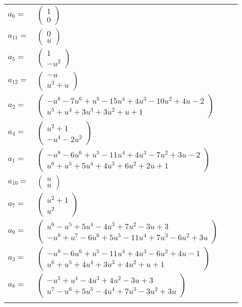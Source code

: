 \documentclass[1p]{elsarticle_modified}
\theoremstyle{definition}
\begin{document}
\begin{tabular}{m{7pt} m{180pt} m{7pt} m{180pt} }
\flushright $a_{6}=$&$\begin{pmatrix}1\\0\end{pmatrix}$ \\
\flushright $a_{11}=$&$\begin{pmatrix}0\\u\end{pmatrix}$ \\
\flushright $a_{5}=$&$\begin{pmatrix}1\\- u^2\end{pmatrix}$ \\
\flushright $a_{12}=$&$\begin{pmatrix}- u\\u^3+u\end{pmatrix}$ \\
\flushright $a_{2}=$&$\begin{pmatrix}- u^8-7 u^6+u^5-15 u^4+4 u^3-10 u^2+4 u-2\\u^5+u^4+3 u^3+3 u^2+u+1\end{pmatrix}$ \\
\flushright $a_{4}=$&$\begin{pmatrix}u^2+1\\- u^4-2 u^2\end{pmatrix}$ \\
\flushright $a_{1}=$&$\begin{pmatrix}- u^8-6 u^6+u^5-11 u^4+4 u^3-7 u^2+3 u-2\\u^6+u^5+5 u^4+4 u^3+6 u^2+2 u+1\end{pmatrix}$ \\
\flushright $a_{10}=$&$\begin{pmatrix}u\\u\end{pmatrix}$ \\
\flushright $a_{7}=$&$\begin{pmatrix}u^2+1\\u^2\end{pmatrix}$ \\
\flushright $a_{9}=$&$\begin{pmatrix}u^6- u^5+5 u^4-4 u^3+7 u^2-3 u+3\\- u^8+u^7-6 u^6+5 u^5-11 u^4+7 u^3-6 u^2+3 u\end{pmatrix}$ \\
\flushright $a_{3}=$&$\begin{pmatrix}- u^8-6 u^6+u^5-11 u^4+4 u^3-6 u^2+4 u-1\\u^6+u^5+4 u^4+3 u^3+4 u^2+u+1\end{pmatrix}$ \\
\flushright $a_{8}=$&$\begin{pmatrix}- u^5+u^4-4 u^3+4 u^2-3 u+3\\u^7- u^6+5 u^5-4 u^4+7 u^3-3 u^2+3 u\end{pmatrix}$\\&\end{tabular}
\end{document}
